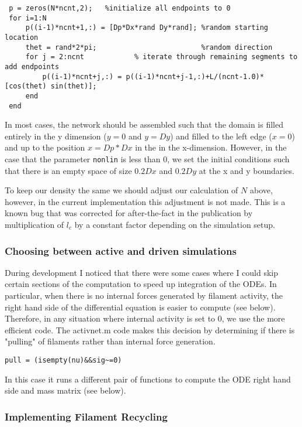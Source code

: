 \begin{verbatim}
 p = zeros(N*ncnt,2);   %initialize all endpoints to 0
 for i=1:N
	 p((i-1)*ncnt+1,:) = [Dp*Dx*rand Dy*rand]; %random starting location
	 thet = rand*2*pi;                         %random direction
	 for j = 2:ncnt            % iterate through remaining segments to add endpoints
		 p((i-1)*ncnt+j,:) = p((i-1)*ncnt+j-1,:)+L/(ncnt-1.0)*[cos(thet) sin(thet)];
	 end
 end
\end{verbatim}

In most cases, the network should be assembled such that the domain is filled entirely in the y dimension ($y=0$ and $y=Dy$) and filled to the left edge ($x=0$) and up to the position $x=Dp*Dx$ in the in the x-dimension.  However, in the case that the parameter \texttt{nonlin} is less than 0, we set the initial conditions such that there is an empty space of size $0.2 Dx$ and $0.2 Dy$ at the x and y boundaries.  

To keep our density the same we should adjust our calculation of $N$ above, however, in the current implementation this adjustment is not made. This is a known bug that was corrected for after-the-fact in the publication by multiplication of $l_c$ by a constant factor depending on the simulation setup. 


\subsubsection{Choosing between active and driven simulations }

During development I noticed that there were some cases where I could skip certain sections of the computation to speed up integration of the ODEs.  In particular, when there is no internal forces generated by filament activity, the right hand side of the differential equation is easier to compute (see below).  Therefore, in any situation where internal activity is set to 0, we use the more efficient code.  The activnet.m code makes this decision by determining if there is "pulling" of filaments rather than internal force generation.  

\begin{verbatim}
pull = (isempty(nu)&&sig~=0) 
\end{verbatim}

In this case it runs a different pair of functions to compute the ODE right hand side and mass matrix (see below).

\subsubsection{Implementing Filament Recycling }

